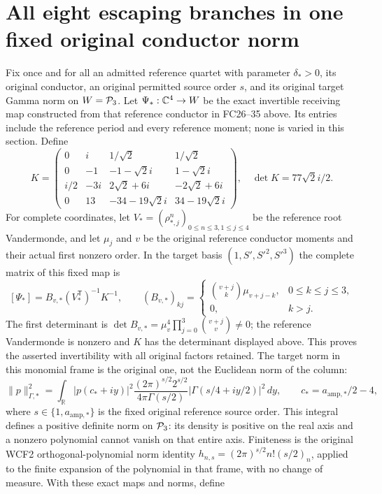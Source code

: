 \section{All eight escaping branches in one fixed original conductor norm}
Fix once and for all an admitted reference quartet with parameter
$\delta_*>0$, its original conductor, an original permitted source
order $s$, and its original target Gamma norm on $W=\mathcal P_3$.
Let $\Psi_*:\mathbb C^4\to W$ be the exact invertible receiving map
constructed from that reference conductor in FC26--35
above. Its entries include the reference period and every
reference moment; none is varied in this section. Define
\[
 K=\begin{pmatrix}
 0&i&1/\sqrt2&1/\sqrt2\\
 0&-1&-1-\sqrt2 i&1-\sqrt2 i\\
 i/2&-3i&2\sqrt2+6i&-2\sqrt2+6i\\
 0&13&-34-19\sqrt2 i&34-19\sqrt2 i
 \end{pmatrix},\quad \det K=77\sqrt2 i/2.
\]
For complete coordinates, let $V_*=(\rho_{*,j}^n)_{0\le n\le3,1\le j\le4}$
be the reference root Vandermonde, and let $\mu_j$ and $v$ be
the original reference conductor moments and their actual first
nonzero order. In the target basis $(1,S',S'^2,S'^3)$ the complete
matrix of this fixed map is
\[
 [\Psi_*]=B_{v,*}(V_*^{\mathsf T})^{-1}K^{-1},\qquad
 (B_{v,*})_{kj}=\begin{cases}
 \binom{v+j}{k}\mu_{v+j-k},&0\le k\le j\le3,\\
 0,&k>j.
 \end{cases}
\]
The first determinant is
$\det B_{v,*}=\mu_v^4\prod_{j=0}^3\binom{v+j}{v}\ne0$;
the reference Vandermonde is nonzero and $K$ has the determinant
displayed above. This proves the asserted invertibility with all
original factors retained. The target norm in this monomial frame
is the original one, not the Euclidean norm of the column:
\[
 \|p\|_{\Gamma,*}^2=
 \int_{\mathbb R}|p(c_*+iy)|^2
 \frac{(2\pi)^{s/2}2^{s/2}}{4\pi\Gamma(s/2)}
 |\Gamma(s/4+iy/2)|^2\,dy,\qquad
 c_*=a_{\mathrm{amp},*}/2-4,
\]
where $s\in\{1,a_{\mathrm{amp},*}\}$ is the fixed original
reference source order. This integral defines a positive definite
norm on $\mathcal P_3$: its density is positive on the real axis and a
nonzero polynomial cannot vanish on that entire axis. Finiteness is
the original WCF2 orthogonal-polynomial norm identity
$h_{n,s}=(2\pi)^{s/2}n!(s/2)_n$, applied to the finite expansion
of the polynomial in that frame, with no change of measure.
With these exact maps and norms, define
